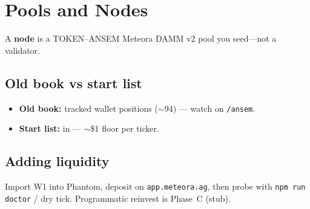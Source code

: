 \chapter{Pools and Nodes}

A \textbf{node} is a TOKEN--ANSEM Meteora DAMM v2 pool you seed---not a validator.

\section{Old book vs start list}

\begin{itemize}
  \item \textbf{Old book:} tracked wallet positions ($\sim$94) --- watch on \texttt{/ansem}.
  \item \textbf{Start list:}  in  --- $\sim$\$1 floor per ticker.
\end{itemize}

\section{Adding liquidity}

Import W1 into Phantom, deposit on \texttt{app.meteora.ag}, then probe with \texttt{npm run doctor} / dry tick. Programmatic reinvest is Phase~C (stub).
